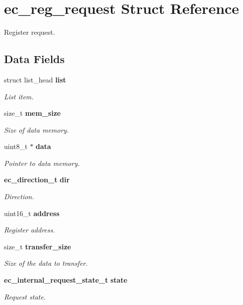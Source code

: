 \section{ec\-\_\-reg\-\_\-request Struct Reference}
\label{structec__reg__request}


Register request.  


\subsection*{Data Fields}
\begin{DoxyCompactItemize}
\item 
struct list\-\_\-head {\bf list}
\begin{DoxyCompactList}\small\item\em List item. \end{DoxyCompactList}\item 
size\-\_\-t {\bf mem\-\_\-size}
\begin{DoxyCompactList}\small\item\em Size of data memory. \end{DoxyCompactList}\item 
uint8\-\_\-t $\ast$ {\bf data}
\begin{DoxyCompactList}\small\item\em Pointer to data memory. \end{DoxyCompactList}\item 
{\bf ec\-\_\-direction\-\_\-t} {\bf dir}
\begin{DoxyCompactList}\small\item\em Direction. \end{DoxyCompactList}\item 
uint16\-\_\-t {\bf address}
\begin{DoxyCompactList}\small\item\em Register address. \end{DoxyCompactList}\item 
size\-\_\-t {\bf transfer\-\_\-size}
\begin{DoxyCompactList}\small\item\em Size of the data to transfer. \end{DoxyCompactList}\item 
{\bf ec\-\_\-internal\-\_\-request\-\_\-state\-\_\-t} {\bf state}
\begin{DoxyCompactList}\small\item\em Request state. \end{DoxyCompactList}\end{DoxyCompactItemize}


